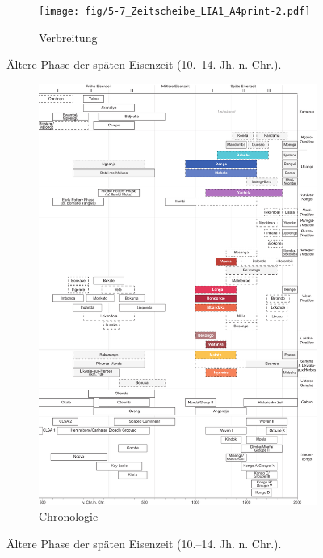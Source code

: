\begin{figure}[p]
	\centering
	\begin{subfigure}[b]{\textwidth}
		\centering
		\texttt{[image: fig/5-7\_Zeitscheibe\_LIA1\_A4print-2.pdf]}
		\vspace{4cm}
		\caption{Verbreitung}
		\label{fig:LIA1_Karte}
	\end{subfigure}
	\caption{Ältere Phase der späten Eisenzeit (10.--14. Jh. n. Chr.).}
	\label{}
\end{figure}
\addtocounter{figure}{-1}
\begin{figure}[p]
	\begin{subfigure}[b]{\textwidth}
		\setcounter{subfigure}{1}
		\centering
		\includegraphics[height = .9\textheight]{fig/Chronologiesystem_v4_Zeitscheibe_LIA1.pdf}
		\caption{Chronologie}
		\label{fig:LIA1_Chronologie}
	\end{subfigure}
	\caption{Ältere Phase der späten Eisenzeit (10.--14. Jh. n. Chr.).}
	\label{fig:LIA1}
\end{figure}


